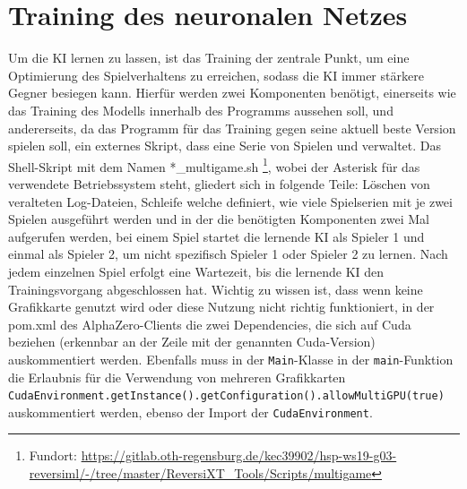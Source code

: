 \documentclass[12pt,a4paper]{article}
\begin{document}
\section{Training des neuronalen Netzes}
Um die KI lernen zu lassen, ist das Training der zentrale Punkt, um eine Optimierung des Spielverhaltens zu erreichen, sodass die KI immer stärkere Gegner besiegen kann.  Hierfür werden zwei Komponenten benötigt, einerseits wie das Training des Modells innerhalb des Programms aussehen soll, und andererseits, da das Programm für das Training gegen seine aktuell beste Version spielen soll, ein externes Skript, dass eine Serie von Spielen und verwaltet. Das Shell-Skript mit dem Namen *\_multigame.sh \footnote{Fundort: \url{https://gitlab.oth-regensburg.de/kec39902/hsp-ws19-g03-reversiml/-/tree/master/ReversiXT_Tools/Scripts/multigame}}, wobei der Asterisk für das verwendete Betriebssystem steht, gliedert sich in folgende Teile: Löschen von veralteten Log-Dateien, Schleife welche definiert, wie viele Spielserien mit je zwei Spielen ausgeführt werden und in der die benötigten Komponenten zwei Mal aufgerufen werden, bei einem Spiel startet die lernende KI als Spieler 1 und einmal als Spieler 2, um nicht spezifisch Spieler 1 oder Spieler 2 zu lernen. Nach jedem einzelnen Spiel erfolgt eine Wartezeit, bis die lernende KI den Trainingsvorgang abgeschlossen hat. Wichtig zu wissen ist, dass wenn keine Grafikkarte genutzt wird oder diese Nutzung nicht richtig funktioniert, in der pom.xml des AlphaZero-Clients die zwei Dependencies, die sich auf Cuda beziehen (erkennbar an der Zeile mit der genannten Cuda-Version) auskommentiert werden. Ebenfalls muss in der \texttt{Main}-Klasse in der \texttt{main}-Funktion die Erlaubnis für die Verwendung von mehreren Grafikkarten \texttt{CudaEnvironment.getInstance().getConfiguration().allowMultiGPU(true)} auskommentiert werden, ebenso der Import der \texttt{CudaEnvironment}. \\
\end{document}
